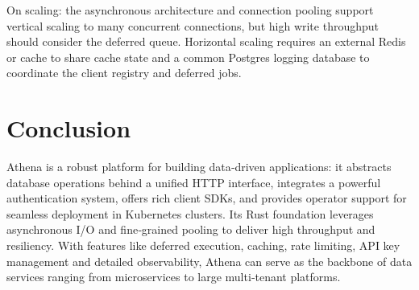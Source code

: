 \documentclass[11pt,a4paper]{article}
\begin{document}
On scaling: the asynchronous architecture and connection pooling support vertical scaling to many concurrent connections, but high write throughput should consider the deferred queue.  Horizontal scaling requires an external Redis or cache to share cache state and a common Postgres logging database to coordinate the client registry and deferred jobs.

\section{Conclusion}

Athena is a robust platform for building data‑driven applications: it abstracts database operations behind a unified HTTP interface, integrates a powerful authentication system, offers rich client SDKs, and provides operator support for seamless deployment in Kubernetes clusters.  Its Rust foundation leverages asynchronous I/O and fine‑grained pooling to deliver high throughput and resiliency.  With features like deferred execution, caching, rate limiting, API key management and detailed observability, Athena can serve as the backbone of data services ranging from microservices to large multi‑tenant platforms.
\end{document}
